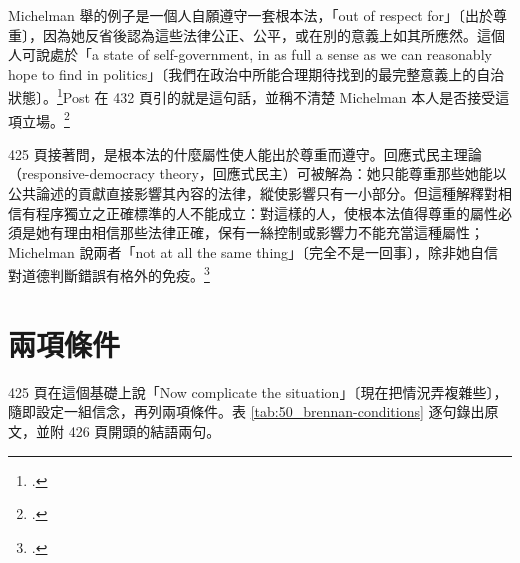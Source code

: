 Michelman 舉的例子是一個人自願遵守一套根本法，「out of respect for」〔出於尊重〕，因為她反省後認為這些法律公正、公平，或在別的意義上如其所應然。這個人可說處於「a state of self-government, in as full a sense as we can reasonably hope to find in politics」〔我們在政治中所能合理期待找到的最完整意義上的自治狀態〕。\footcite[424--425]{michelman1998}Post 在 432 頁引的就是這句話，並稱不清楚 Michelman 本人是否接受這項立場。\footcite[432 \& n.12]{post1998}

425 頁接著問，是根本法的什麼屬性使人能出於尊重而遵守。回應式民主理論（responsive-democracy theory，回應式民主）可被解為：她只能尊重那些她能以公共論述的貢獻直接影響其內容的法律，縱使影響只有一小部分。但這種解釋對相信有程序獨立之正確標準的人不能成立：對這樣的人，使根本法值得尊重的屬性必須是她有理由相信那些法律正確，保有一絲控制或影響力不能充當這種屬性；Michelman 說兩者「not at all the same thing」〔完全不是一回事〕，除非她自信對道德判斷錯誤有格外的免疫。\footcite[425]{michelman1998}

\section{兩項條件}
\label{sec:50_brennan-2}

425 頁在這個基礎上說「Now complicate the situation」〔現在把情況弄複雜些〕，隨即設定一組信念，再列兩項條件。表 \ref{tab:50_brennan-conditions} 逐句錄出原文，並附 426 頁開頭的結語兩句。

